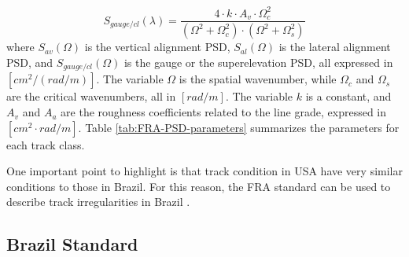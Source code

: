 \begin{equation}
    S_{gauge/cl}(\lambda) = \frac{4 \cdot k \cdot A_v \cdot \Omega_c^2}{\left(\Omega^2 + \Omega_c^2\right) \cdot \left(\Omega^2 + \Omega_s^2\right)}
    \label{eq:FRA-gauge}
\end{equation}
where $S_{av}(\Omega)$ is the vertical alignment PSD, $S_{al}(\Omega)$ is the lateral alignment PSD, and $S_{gauge/cl}(\Omega)$ is the gauge or the superelevation PSD, all expressed in $[cm^2 / (rad/m)]$. The variable $\Omega$ is the spatial wavenumber, while $\Omega_c$ and $\Omega_s$ are the critical wavenumbers, all in $[rad/m]$. The variable $k$ is a constant, and $A_v$ and $A_a$ are the roughness coefficients related to the line grade, expressed in $[cm^2 \cdot rad /m]$. Table \ref{tab:FRA-PSD-parameters} summarizes the parameters for each track class.

\begin{table}[h!]
\centering
{}
\caption{Summary of the parameters for each track class. \cite{PIRES2021107806}}
\label{tab:FRA-PSD-parameters}
\end{table}

One important point to highlight is that track condition in USA have very similar conditions to those in Brazil. For this reason, the FRA standard can be used to describe track irregularities in Brazil \cite{PIRES2021107806}.

\subsection{Brazil Standard} \label{sec-Brazil-Standard}

